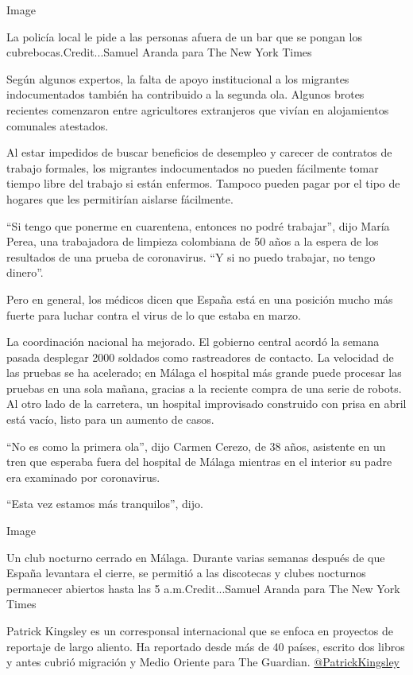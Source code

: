 Image

La policía local le pide a las personas afuera de un bar que se pongan
los cubrebocas.Credit...Samuel Aranda para The New York Times

Según algunos expertos, la falta de apoyo institucional a los migrantes
indocumentados también ha contribuido a la segunda ola. Algunos brotes
recientes comenzaron entre agricultores extranjeros que vivían en
alojamientos comunales atestados.

Al estar impedidos de buscar beneficios de desempleo y carecer de
contratos de trabajo formales, los migrantes indocumentados no pueden
fácilmente tomar tiempo libre del trabajo si están enfermos. Tampoco
pueden pagar por el tipo de hogares que les permitirían aislarse
fácilmente.

``Si tengo que ponerme en cuarentena, entonces no podré trabajar'', dijo
María Perea, una trabajadora de limpieza colombiana de 50 años a la
espera de los resultados de una prueba de coronavirus. ``Y si no puedo
trabajar, no tengo dinero''.

Pero en general, los médicos dicen que España está en una posición mucho
más fuerte para luchar contra el virus de lo que estaba en marzo.

La coordinación nacional ha mejorado. El gobierno central acordó la
semana pasada desplegar 2000 soldados como rastreadores de contacto. La
velocidad de las pruebas se ha acelerado; en Málaga el hospital más
grande puede procesar las pruebas en una sola mañana, gracias a la
reciente compra de una serie de robots. Al otro lado de la carretera, un
hospital improvisado construido con prisa en abril está vacío, listo
para un aumento de casos.

``No es como la primera ola'', dijo Carmen Cerezo, de 38 años, asistente
en un tren que esperaba fuera del hospital de Málaga mientras en el
interior su padre era examinado por coronavirus.

``Esta vez estamos más tranquilos'', dijo.

Image

Un club nocturno cerrado en Málaga. Durante varias semanas después de
que España levantara el cierre, se permitió a las discotecas y clubes
nocturnos permanecer abiertos hasta las 5 a.m.Credit...Samuel Aranda
para The New York Times

Patrick Kingsley es un corresponsal internacional que se enfoca en
proyectos de reportaje de largo aliento. Ha reportado desde más de 40
países, escrito dos libros y antes cubrió migración y Medio Oriente para
The Guardian.
\href{https://twitter.com/PatrickKingsley}{@PatrickKingsley}

